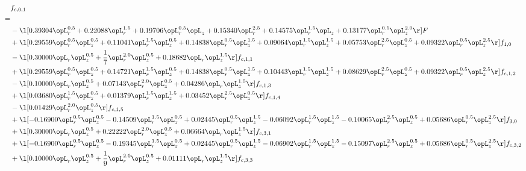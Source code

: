 \begin{alignat}{2} 
\label{eq:f_01_2} 
& f_{c,0,1} \nonumber \\ 
 = \\ 
& - \l[  0.39304 \opL_r^{0.5} +  0.22088 \opL_r^{1.5} +  0.19706 \opL_r^{0.5} \opL_z +  0.15340 \opL_r^{2.5} +  0.14575 \opL_r^{1.5} \opL_z +  0.13177 \opL_r^{0.5} \opL_z^{2.0}  \r] F \nonumber \\ 
& + \l[  0.29559 \opL_r^{0.5} \opL_z^{0.5} +  0.11041 \opL_r^{1.5} \opL_z^{0.5} +  0.14838 \opL_r^{0.5} \opL_z^{1.5} +  0.09064 \opL_r^{1.5} \opL_z^{1.5} +  0.05753 \opL_r^{2.5} \opL_z^{0.5} +  0.09322 \opL_r^{0.5} \opL_z^{2.5}  \r] f_{1,0} \nonumber \\ 
& - \l[  0.30000 \opL_r \opL_z^{0.5} + \frac{1}{7} \opL_r^{2.0} \opL_z^{0.5} +  0.18682 \opL_r \opL_z^{1.5}  \r] f_{c,1,1} \nonumber \\ 
& + \l[  0.29559 \opL_r^{0.5} \opL_z^{0.5} +  0.14721 \opL_r^{1.5} \opL_z^{0.5} +  0.14838 \opL_r^{0.5} \opL_z^{1.5} +  0.10443 \opL_r^{1.5} \opL_z^{1.5} +  0.08629 \opL_r^{2.5} \opL_z^{0.5} +  0.09322 \opL_r^{0.5} \opL_z^{2.5}  \r] f_{c,1,2} \nonumber \\ 
& - \l[  0.10000 \opL_r \opL_z^{0.5} +  0.07143 \opL_r^{2.0} \opL_z^{0.5} +  0.04286 \opL_r \opL_z^{1.5}  \r] f_{c,1,3} \nonumber \\ 
& + \l[  0.03680 \opL_r^{1.5} \opL_z^{0.5} +  0.01379 \opL_r^{1.5} \opL_z^{1.5} +  0.03452 \opL_r^{2.5} \opL_z^{0.5}  \r] f_{c,1,4} \nonumber \\ 
& - \l[  0.01429 \opL_r^{2.0} \opL_z^{0.5}  \r] f_{c,1,5} \nonumber \\ 
& + \l[  -0.16900 \opL_r^{0.5} \opL_z^{0.5}   -0.14509 \opL_r^{1.5} \opL_z^{0.5} +  0.02445 \opL_r^{0.5} \opL_z^{1.5}   -0.06092 \opL_r^{1.5} \opL_z^{1.5}   -0.10065 \opL_r^{2.5} \opL_z^{0.5} +  0.05686 \opL_r^{0.5} \opL_z^{2.5}  \r] f_{3,0} \nonumber \\ 
& + \l[  0.30000 \opL_r \opL_z^{0.5} +  0.22222 \opL_r^{2.0} \opL_z^{0.5} +  0.06664 \opL_r \opL_z^{1.5}  \r] f_{c,3,1} \nonumber \\ 
& + \l[  -0.16900 \opL_r^{0.5} \opL_z^{0.5}   -0.19345 \opL_r^{1.5} \opL_z^{0.5} +  0.02445 \opL_r^{0.5} \opL_z^{1.5}   -0.06902 \opL_r^{1.5} \opL_z^{1.5}   -0.15097 \opL_r^{2.5} \opL_z^{0.5} +  0.05686 \opL_r^{0.5} \opL_z^{2.5}  \r] f_{c,3,2} \nonumber \\ 
& + \l[  0.10000 \opL_r \opL_z^{0.5} + \frac{1}{9} \opL_r^{2.0} \opL_z^{0.5} +  0.01111 \opL_r \opL_z^{1.5}  \r] f_{c,3,3} \nonumber \\ 

\end{alignat}
